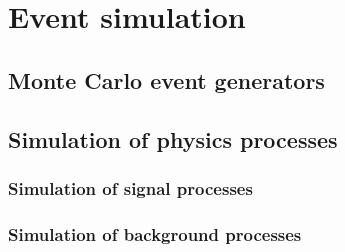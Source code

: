 \chapter{Event simulation}
\label{ch:dataAndSim}

\section{Monte Carlo event generators}
\section{Simulation of physics processes}
\subsection{Simulation of signal processes}
\subsection{Simulation of background processes}